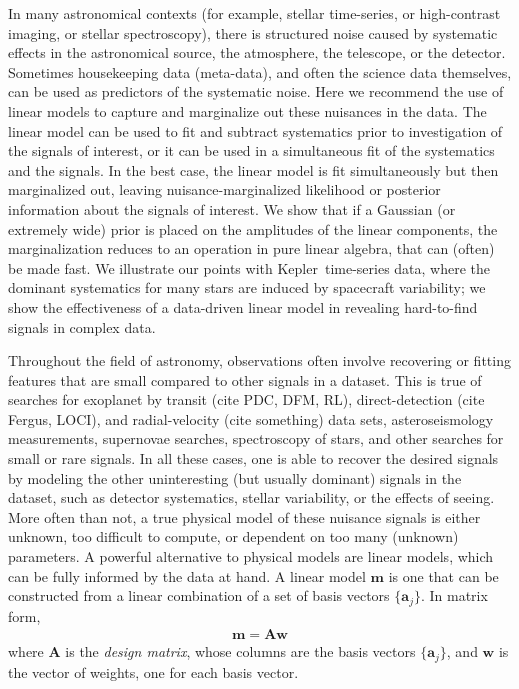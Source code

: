 \documentclass[modern]{rnaastex}
\newcommand{\project}[1]{\textsf{#1}}
\newcommand{\kepler}{\project{Kepler}}
\newcommand{\bvec}[1]{{\ensuremath{\boldsymbol{#1}}}}
\begin{document}
In many astronomical contexts (for example, stellar time-series, or
high-contrast imaging, or stellar spectroscopy), there is structured
noise caused by systematic
effects in the astronomical source, the atmosphere, the telescope, or
the detector.
Sometimes housekeeping data (meta-data), and often the science data themselves,
can be used as predictors of the systematic noise.
Here we recommend the use of linear models to capture and marginalize
out these nuisances in the data.
The linear model can be used to fit and subtract systematics prior to
investigation of the signals of interest, or it
can be used in a simultaneous fit of the systematics and the signals.
In the best case, the linear model is fit simultaneously but then marginalized
out, leaving nuisance-marginalized likelihood or posterior information
about the signals of interest.
We show that if a Gaussian (or extremely wide) prior is placed on the
amplitudes of the linear components, the marginalization reduces to an
operation in pure linear algebra, that can (often) be made fast.
We illustrate our points with \kepler\ time-series data, where the dominant
systematics for many stars are induced by spacecraft variability;
we show the effectiveness of a data-driven linear model in revealing
hard-to-find signals in complex data.

Throughout the field of astronomy, observations often involve recovering or
fitting features that are small compared to other signals in a dataset.
This is true of searches for exoplanet by transit (cite PDC, DFM, RL),
direct-detection (cite Fergus, LOCI), and radial-velocity  (cite something)
data sets, asteroseismology measurements, supernovae searches, spectroscopy
of stars, and other searches for small or rare signals. In all these cases,
one is able to recover the desired signals by modeling the other uninteresting
(but usually dominant) signals in the dataset, such as detector systematics,
stellar variability, or the effects of seeing.
More often than not, a true physical model of these nuisance signals is either
unknown, too difficult to compute, or dependent on too many (unknown)
parameters. A powerful alternative to physical models are linear models, which
can be fully informed by the data at hand. A linear model $\bvec{m}$ is one
that can be constructed from a linear combination of a set of basis vectors
$\{\bvec{a}_j\}$. In matrix form,
%
\begin{align}
\bvec{m} = \bvec{A} \bvec{w}
\end{align}
%
where $\bvec{A}$ is the \emph{design matrix}, whose columns are the basis
vectors $\{\bvec{a}_j\}$, and $\bvec{w}$ is the vector of weights, one
for each basis vector.
\end{document}
